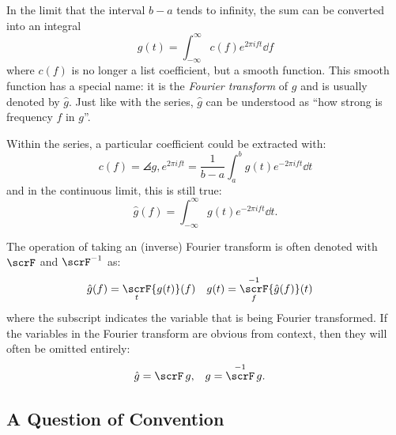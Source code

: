 \documentclass[
  a4paper,             %
  11pt,                %
  oneside,             %
  onecolumn,           %
  bibliography=totoc,  %
  final,               %
]{scrartcl}
\DeclareMathOperator{\FT}{\scrF}
\newcounter{question}
\begin{document}
In the limit that the interval \(b - a\) tends to infinity, the sum can be
converted into an integral
\begin{equation}
  \label{eq:inverse_fourier_transform}
  g(t) = \int_{-\infty}^{\infty} c(f) e^{2\pi i f t} \dd f
\end{equation}
where \(c(f)\) is no longer a list coefficient, but a smooth function.  This
smooth function has a special name: it is the \emph{Fourier transform} of \(g\)
and is usually denoted by \(\hat g\).  Just like with the series, \(\hat g\) can
be understood as \enquote{how strong is frequency \(f\) in \(g\)}.

Within the series, a particular coefficient could be extracted with:
\begin{equation}
  c(f) = \angles{g, e^{2\pi i f t}} = \frac{1}{b-a} \int_{a}^{b} g(t) e^{-2\pi i f t} \dd t
\end{equation}
and in the continuous limit, this is still true:
\begin{equation}
  \label{eq:fourier_transform}
  \hat g(f) = \int_{-\infty}^{\infty} g(t) e^{-2\pi i f t} \dd t.
\end{equation}

The operation of taking an (inverse) Fourier transform is often denoted with
\(\FT\) and \(\FT^{-1}\) as:
\begin{align}
  \hat g(f) &= \FT_{t}\{g(t)\}(f) &
  g(t) &= \FT_{f}^{-1}\{\hat g(f)\}(t)
\end{align}
where the subscript indicates the variable that is being Fourier transformed.
If the variables in the Fourier transform are obvious from context, then they
will often be omitted entirely:
\begin{align}
  \hat g &= \FT g, &
  g &= \FT^{-1} g.
\end{align}


\subsection{A Question of Convention}
\label{subsec:a_question_of_convention}
\end{document}
